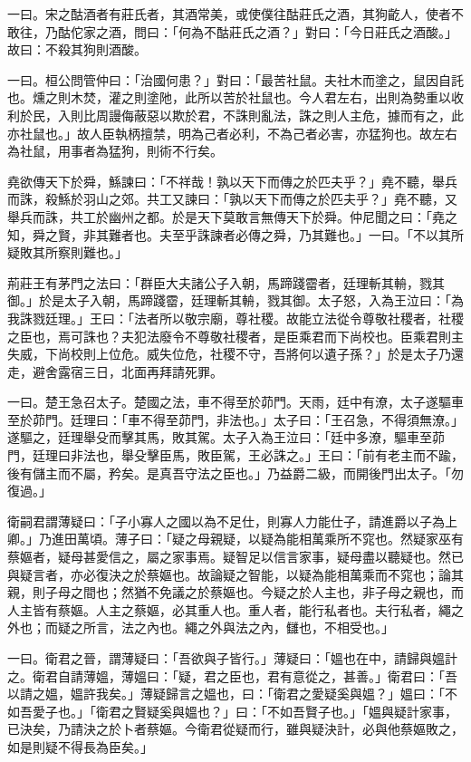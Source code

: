 \begin{pinyinscope}
一曰。宋之酤酒者有莊氏者，其酒常美，或使僕往酤莊氏之酒，其狗齕人，使者不敢往，乃酤佗家之酒，問曰：「何為不酤莊氏之酒？」對曰：「今日莊氏之酒酸。」故曰：不殺其狗則酒酸。

一曰。桓公問管仲曰：「治國何患？」對曰：「最苦社鼠。夫社木而塗之，鼠因自託也。燻之則木焚，灌之則塗阤，此所以苦於社鼠也。今人君左右，出則為勢重以收利於民，入則比周謾侮蔽惡以欺於君，不誅則亂法，誅之則人主危，據而有之，此亦社鼠也。」故人臣執柄擅禁，明為己者必利，不為己者必害，亦猛狗也。故左右為社鼠，用事者為猛狗，則術不行矣。

堯欲傳天下於舜，鯀諫曰：「不祥哉！孰以天下而傳之於匹夫乎？」堯不聽，舉兵而誅，殺鯀於羽山之郊。共工又諫曰：「孰以天下而傳之於匹夫乎？」堯不聽，又舉兵而誅，共工於幽州之都。於是天下莫敢言無傳天下於舜。仲尼聞之曰：「堯之知，舜之賢，非其難者也。夫至乎誅諫者必傳之舜，乃其難也。」一曰。「不以其所疑敗其所察則難也。」

荊莊王有茅門之法曰：「群臣大夫諸公子入朝，馬蹄踐霤者，廷理斬其輈，戮其御。」於是太子入朝，馬蹄踐霤，廷理斬其輈，戮其御。太子怒，入為王泣曰：「為我誅戮廷理。」王曰：「法者所以敬宗廟，尊社稷。故能立法從令尊敬社稷者，社稷之臣也，焉可誅也？夫犯法廢令不尊敬社稷者，是臣乘君而下尚校也。臣乘君則主失威，下尚校則上位危。威失位危，社稷不守，吾將何以遺子孫？」於是太子乃還走，避舍露宿三日，北面再拜請死罪。

一曰。楚王急召太子。楚國之法，車不得至於茆門。天雨，廷中有潦，太子遂驅車至於茆門。廷理曰：「車不得至茆門，非法也。」太子曰：「王召急，不得須無潦。」遂驅之，廷理舉殳而擊其馬，敗其駕。太子入為王泣曰：「廷中多潦，驅車至茆門，廷理曰非法也，舉殳擊臣馬，敗臣駕，王必誅之。」王曰：「前有老主而不踰，後有儲主而不屬，矜矣。是真吾守法之臣也。」乃益爵二級，而開後門出太子。「勿復過。」

衛嗣君謂薄疑曰：「子小寡人之國以為不足仕，則寡人力能仕子，請進爵以子為上卿。」乃進田萬頃。薄子曰：「疑之母親疑，以疑為能相萬乘所不窕也。然疑家巫有蔡嫗者，疑母甚愛信之，屬之家事焉。疑智足以信言家事，疑母盡以聽疑也。然已與疑言者，亦必復決之於蔡嫗也。故論疑之智能，以疑為能相萬乘而不窕也；論其親，則子母之間也；然猶不免議之於蔡嫗也。今疑之於人主也，非子母之親也，而人主皆有蔡嫗。人主之蔡嫗，必其重人也。重人者，能行私者也。夫行私者，繩之外也；而疑之所言，法之內也。繩之外與法之內，讎也，不相受也。」

一曰。衛君之晉，謂薄疑曰：「吾欲與子皆行。」薄疑曰：「媼也在中，請歸與媼計之。衛君自請薄媼，薄媼曰：「疑，君之臣也，君有意從之，甚善。」衛君曰：「吾以請之媼，媼許我矣。」薄疑歸言之媼也，曰：「衛君之愛疑奚與媼？」媼曰：「不如吾愛子也。」「衛君之賢疑奚與媼也？」曰：「不如吾賢子也。」「媼與疑計家事，已決矣，乃請決之於卜者蔡嫗。今衛君從疑而行，雖與疑決計，必與他蔡嫗敗之，如是則疑不得長為臣矣。」


\end{pinyinscope}
